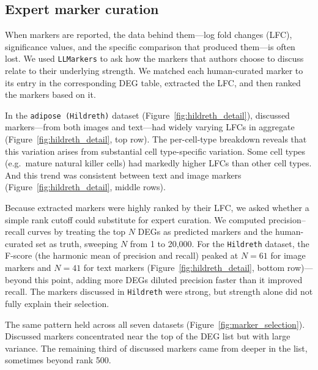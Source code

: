 \documentclass[10pt,twocolumn]{article}
\theoremstyle{plain}
\theoremstyle{definition}
\theoremstyle{remark}
\begin{document}
\subsection{Expert marker curation}
When markers are reported, the data behind them---log fold changes (LFC), significance values, and the specific comparison that produced them---is often lost. We used \texttt{LLMarkers} to ask how the markers that authors choose to discuss relate to their underlying strength. We matched each human-curated marker to its entry in the corresponding DEG table, extracted the LFC, and then ranked the markers based on it.  

In the \texttt{adipose (Hildreth)} dataset (Figure~\ref{fig:hildreth_detail}), discussed markers---from both images and text---had widely varying LFCs in aggregate (Figure~\ref{fig:hildreth_detail}, top row). The per-cell-type breakdown reveals that this variation arises from substantial cell type-specific variation. Some cell types (e.g.\ mature natural killer cells) had markedly higher LFCs than other cell types. And this trend was consistent between text and image markers (Figure~\ref{fig:hildreth_detail}, middle rows). 

Because extracted markers were highly ranked by their LFC, we asked whether a simple rank cutoff could substitute for expert curation. We computed precision--recall curves by treating the top $N$ DEGs as predicted markers and the human-curated set as truth, sweeping $N$ from 1 to 20{,}000. For the \texttt{Hildreth} dataset, the F-score (the harmonic mean of precision and recall) peaked at $N = 61$ for image markers and $N = 41$ for text markers (Figure~\ref{fig:hildreth_detail}, bottom row)---beyond this point, adding more DEGs diluted precision faster than it improved  recall. The markers discussed in \texttt{Hildreth} were strong, but strength alone did not fully explain their selection.

The same pattern held across all seven datasets (Figure~\ref{fig:marker_selection}). Discussed markers concentrated near the top of the DEG list but with large variance.  The remaining third of discussed markers came from deeper in the list, sometimes beyond rank 500. 
\end{document}
